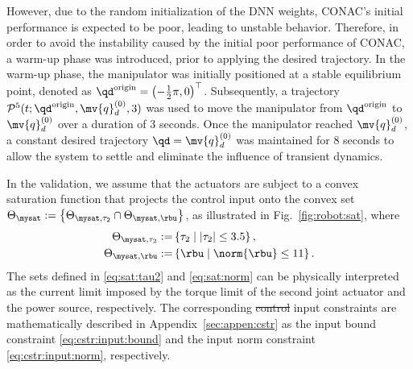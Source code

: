 \documentclass[letterpaper, journal]{IEEEtran}
\providecommand{\DIFdel}[1]{{\protect\color{red}\sout{#1}}} %
\providecommand{\DIFdelbegin}{} %
\providecommand{\DIFdelend}{} %
\begin{document}
However, due to the random initialization of the DNN weights, CONAC's initial performance is expected to be poor, leading to unstable behavior.
Therefore, in order to avoid the instability caused by the initial poor performance of CONAC, a warm-up phase was introduced, prior to applying the desired trajectory.
In the warm-up phase, the manipulator was initially positioned at a stable equilibrium point, denoted as ${\qd}^{\rm{origin}} = \left(-\tfrac{1}{2}\pi, 0\right)^\top$.
Subsequently, a trajectory $\mathcal{P}^5(t; {\qd}^{\rm{origin}}, \mv{q}_d^{(0)},3)$ was used to move the manipulator from ${\qd}^{\rm{origin}}$ to $\mv{q}_d^{(0)}$ over a duration of 3 seconds.
Once the manipulator reached $\mv{q}_d^{(0)}$, a constant desired trajectory $\qd = \mv{q}_d^{(0)}$ was maintained for 8 seconds to allow the system to settle and eliminate the influence of transient dynamics.

In the validation, we assume that the actuators are subject to a convex saturation function that projects the control input onto the convex set 
$
    \Theta_{\mysat} :=\left\{ \Theta_{\mysat, {\tau_2}} \cap \Theta_{\mysat, {\rbu}} \right\}
$, as illustrated in Fig.~\ref{fig:robot:sat}, where
\begin{subequations}
    \begin{align}
        \Theta_{\mysat, {\tau_2}}
        :=&
        \left\{
            \tau_2
            \mid
            \vert{\tau_2}\vert \le 
            3.5
        \right\}
        ,
        \label{eq:sat:tau2}
        \\    
        \Theta_{\mysat, {\rbu}}
        :=&
        \left\{
            \rbu
            \mid
            \norm{\rbu} \le 
            11
        \right\}
        .
        \label{eq:sat:norm}
    \end{align}
    \label{eq:sat}%
\end{subequations}
The sets defined in \eqref{eq:sat:tau2} and \eqref{eq:sat:norm} can be physically interpreted as the current limit imposed by the torque limit of the second joint actuator and the power source, respectively.
The corresponding \DIFdelbegin \DIFdel{control }\DIFdelend input constraints are mathematically described in Appendix~\ref{sec:appen:cstr} as the input bound constraint \eqref{eq:cstr:input:bound} and the input norm constraint \eqref{eq:cstr:input:norm}, respectively.
\end{document}
